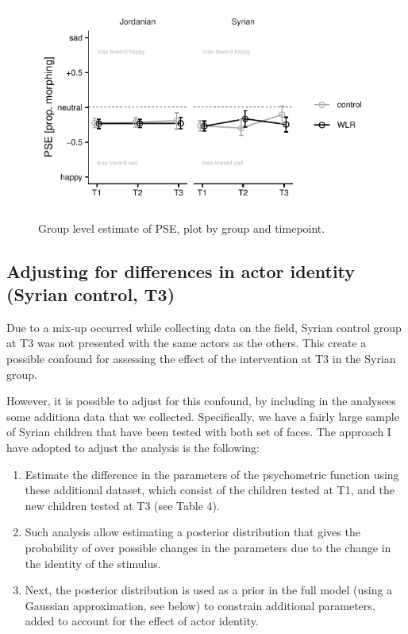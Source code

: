 \documentclass[]{article}
\begin{document}
\begin{figure}[H]

{\centering \includegraphics{WLR-analyses-report_files/figure-latex/unnamed-chunk-4-1} 

}

\caption{Group level estimate of PSE, plot by group and timepoint.}\label{fig:unnamed-chunk-4}
\end{figure}

\hypertarget{adjusting-for-differences-in-actor-identity-syrian-control-t3}{%
\subsection{Adjusting for differences in actor identity (Syrian control,
T3)}\label{adjusting-for-differences-in-actor-identity-syrian-control-t3}}

Due to a mix-up occurred while collecting data on the field, Syrian
control group at T3 was not presented with the same actors as the
others. This create a possible confound for assessing the effect of the
intervention at T3 in the Syrian group.

However, it is possible to adjust for this confound, by including in the
analysees some additiona data that we collected. Specifically, we have a
fairly large sample of Syrian children that have been tested with both
set of faces. The approach I have adopted to adjust the analysis is the
following:

\begin{enumerate}
\def\labelenumi{\arabic{enumi}.}
\item
  Estimate the difference in the parameters of the psychometric function
  using these additional dataset, which consist of the children tested
  at T1, and the new children tested at T3 (see Table 4).
\item
  Such analysis allow estimating a posterior distribution that gives the
  probability of over possible changes in the parameters due to the
  change in the identity of the stimulus.
\item
  Next, the posterior distribution is used as a prior in the full model
  (using a Gaussian approximation, see below) to constrain additional
  parameters, added to account for the effect of actor identity.
\end{enumerate}
\end{document}
